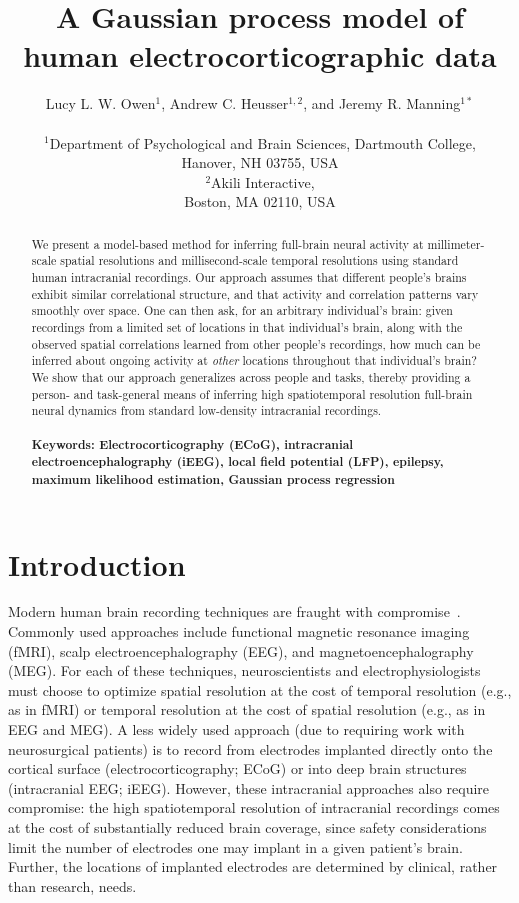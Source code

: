 \documentclass[11pt]{article}
\title{A Gaussian process model of human electrocorticographic data}
\author{
  Lucy L. W. Owen$^{1}$,
  Andrew C. Heusser$^{1, 2}$, and
  Jeremy R. Manning$^{1\ast}$\\\\
$^{1}$Department of Psychological and Brain Sciences, Dartmouth College,\\
Hanover, NH 03755, USA\\
$^{2}$Akili Interactive,\\
Boston, MA 02110, USA}
\date{}
\begin{document}
 

\baselineskip24pt
\maketitle 

\begin{abstract}
  We present a model-based method for inferring full-brain neural
  activity at millimeter-scale spatial resolutions and
  millisecond-scale temporal resolutions using standard human
  intracranial recordings.  Our approach assumes that different
  people's brains exhibit similar correlational structure, and that
  activity and correlation patterns vary smoothly over space.  One can
  then ask, for an arbitrary individual's brain: given recordings from
  a limited set of locations in that individual's brain, along with
  the observed spatial correlations learned from other people's
  recordings, how much can be inferred about ongoing activity at
  \textit{other} locations throughout that
  individual's brain?  We show that our approach generalizes across
  people and tasks, thereby providing a person- and task-general means
  of inferring high spatiotemporal resolution full-brain neural
  dynamics from standard low-density intracranial recordings.
  \\\\
  \footnotesize{\textbf{Keywords: Electrocorticography (ECoG),
      intracranial electroencephalography (iEEG), local field
      potential (LFP), epilepsy, maximum likelihood estimation,
      Gaussian process regression}}
\end{abstract}

\section*{Introduction}
Modern human brain recording techniques are fraught with
compromise~\citep{SejnEtal14}.  Commonly used approaches include
functional magnetic resonance imaging (fMRI), scalp
electroencephalography (EEG), and magnetoencephalography (MEG).  For
each of these techniques, neuroscientists and electrophysiologists
must choose to optimize spatial resolution at the cost of temporal
resolution (e.g., as in fMRI) or temporal resolution at the cost of
spatial resolution (e.g., as in EEG and MEG).  A less widely used
approach (due to requiring work with neurosurgical patients) is to
record from electrodes implanted directly onto the cortical surface
(electrocorticography; ECoG) or into deep brain structures
(intracranial EEG; iEEG).  However, these intracranial approaches also
require compromise: the high spatiotemporal resolution of
intracranial recordings comes at the cost of substantially reduced
brain coverage, since safety considerations limit the number of
electrodes one may implant in a given patient's brain.  Further, the
locations of implanted electrodes are determined by clinical, rather
than research, needs.
\end{document}
